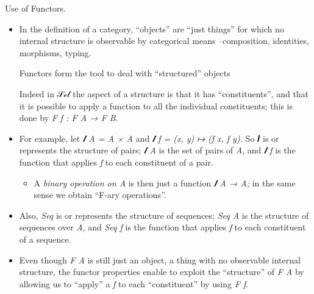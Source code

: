 \documentclass[11pt]{article}
\begin{document}
Use of Functors.
\begin{itemize}
\item In the definition of a category, “objects” are “just things” for which no internal
structure is observable by categorical means --composition, identities, morphisms, typing.

Functors form the tool to deal with “structured” objects

Indeed in 𝒮ℯ𝓉 the aspect of a structure is that it has “constituents”, and that it is possible
to apply a function to all the individual constituents; this is done by
\emph{F f : F A → F B}.

\item For example, let \emph{𝑰 A = A × A} and \emph{𝑰 f = (x, y) ↦ (f x, f y).}
So 𝑰 is or represents the structure of pairs; \emph{𝑰 A} is the set of pairs of \emph{A},
and \emph{𝑰 f} is the function that applies \emph{f} to each constituent of a pair.

\begin{itemize}
\item A \emph{binary operation on A} is then just a function \emph{𝑰 A → A;}
in the same sense we obtain “F-ary operations”.
\end{itemize}

\item Also, \emph{Seq} is or represents the structure of sequences; \emph{Seq A} is the structure of sequences
over \emph{A}, and \emph{Seq f} is the function that applies \emph{f} to each constituent of a sequence.

\item Even though \emph{F A} is still just an object, a thing with no observable internal structure, the
functor properties enable to exploit the “structure” of \emph{F A} by allowing us to “apply”
a \emph{f} to each “constituent” by using \emph{F f}.
\end{itemize}

\vspace{1em}
\end{document}
